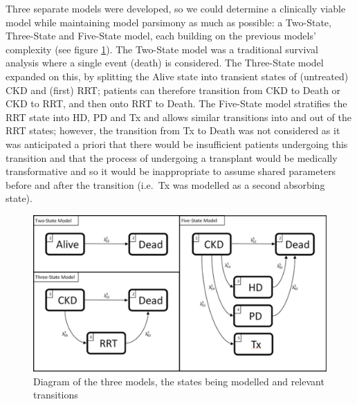 \documentclass[12pt,PhD,twoside,openright]{muthesis}
\begin{document}
Three separate models were developed, so we could determine a clinically viable model while maintaining model parsimony as much as possible: a Two-State, Three-State and Five-State model, each building on the previous models' complexity (see figure \ref{fig:State-Diagram}). The Two-State model was a traditional survival analysis where a single event (death) is considered. The Three-State model expanded on this, by splitting the Alive state into transient states of (untreated) CKD and (first) RRT; patients can therefore transition from CKD to Death or CKD to RRT, and then onto RRT to Death. The Five-State model stratifies the RRT state into HD, PD and Tx and allows similar transitions into and out of the RRT states; however, the transition from Tx to Death was not considered as it was anticipated a priori that there would be insufficient patients undergoing this transition and that the process of undergoing a transplant would be medically transformative and so it would be inappropriate to assume shared parameters before and after the transition (i.e.~Tx was modelled as a second absorbing state).
\begin{figure}

{\centering \includegraphics[width=0.9\linewidth]{figure/Dev_Paper_State_Diagrams} 

}

\caption{Diagram of the three models, the states being modelled and relevant transitions}\label{fig:State-Diagram}
\end{figure}
\end{document}
